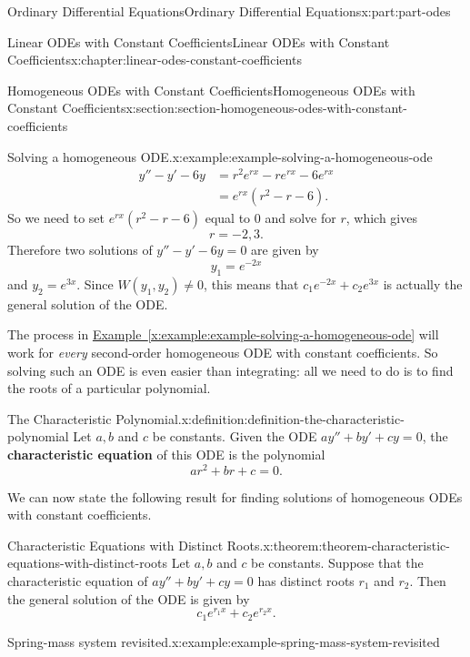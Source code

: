 \documentclass[oneside,10pt,]{book}
\newcommand{\xreffont}{\relax}
\newcommand{\terminology}[1]{\textbf{#1}}
\numberwithin{equation}{part}
\newcommand{\amp}{&}
\begin{document}
\begin{partptx}{Ordinary Differential Equations}{}{Ordinary Differential Equations}{}{}{x:part:part-odes}
\begin{chapterptx}{Linear ODEs with Constant Coefficients}{}{Linear ODEs with Constant Coefficients}{}{}{x:chapter:linear-odes-constant-coefficients}
\begin{sectionptx}{Homogeneous ODEs with Constant Coefficients}{}{Homogeneous ODEs with Constant Coefficients}{}{}{x:section:section-homogeneous-odes-with-constant-coefficients}
\begin{example}{Solving a homogeneous ODE.}{x:example:example-solving-a-homogeneous-ode}
%
\begin{align*}
y''- y' - 6y \amp = r^{2}e^{rx} - re^{rx} - 6e^{rx} \\
\amp = e^{rx}(r^{2} - r - 6). 
\end{align*}
So we need to set \(e^{rx}(r^{2} - r - 6)\) equal to \(0\) and solve for \(r\), which gives%
\begin{equation*}
r = -2, 3.
\end{equation*}
Therefore two solutions of \(y'' - y' - 6y = 0\) are given by%
\begin{equation*}
y_{1} = e^{-2x}
\end{equation*}
and \(y_{2} = e^{3x}\). Since \(W(y_{1},y_{2})\neq0\), this means that \(c_{1}e^{-2x} + c_{2}e^{3x}\) is actually the general solution of the ODE.%
\end{example}
The process in \hyperref[x:example:example-solving-a-homogeneous-ode]{Example~{\xreffont\ref{x:example:example-solving-a-homogeneous-ode}}} will work for \emph{every} second-order homogeneous ODE with constant coefficients. So solving such an ODE is even easier than integrating: all we need to do is to find the roots of a particular polynomial.%
\begin{definition}{The Characteristic Polynomial.}{x:definition:definition-the-characteristic-polynomial}%
%
Let \(a,b\) and \(c\) be constants. Given the ODE \(ay'' + by' + cy = 0\), the \terminology{characteristic equation} of this ODE is the polynomial%
\begin{equation*}
ar^{2} + br + c = 0.
\end{equation*}
%
\end{definition}
We can now state the following result for finding solutions of homogeneous ODEs with constant coefficients.%
\begin{theorem}{Characteristic Equations with Distinct Roots.}{}{x:theorem:theorem-characteristic-equations-with-distinct-roots}%
Let \(a,b\) and \(c\) be constants. Suppose that the characteristic equation of \(ay'' + by' + cy = 0\) has distinct roots \(r_{1}\) and \(r_{2}\). Then the general solution of the ODE is given by%
\begin{equation*}
c_{1}e^{r_{1}x} + c_{2}e^{r_{2}x}.
\end{equation*}
%
\end{theorem}
\begin{example}{Spring-mass system revisited.}{x:example:example-spring-mass-system-revisited}%

\end{example}
\end{sectionptx}
\end{chapterptx}
\end{partptx}
\end{document}
